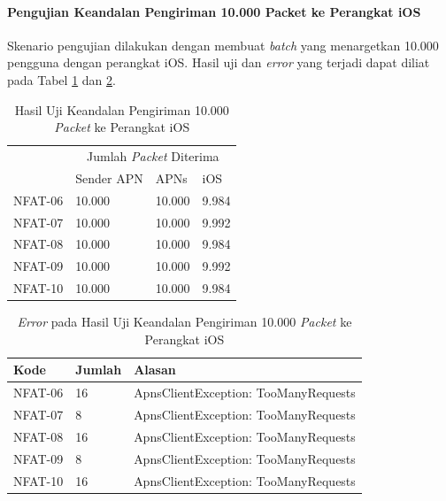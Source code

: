 \paragraph{Pengujian Keandalan Pengiriman 10.000 Packet ke Perangkat iOS}
\par Skenario pengujian dilakukan dengan membuat \textit{batch} yang menargetkan 10.000 pengguna dengan perangkat iOS. Hasil uji dan \textit{error} yang terjadi dapat diliat pada Tabel \ref{t:keandalan-ios-10k} dan \ref{t:error-keandalan-ios-10k}.
\begin{longtable}{|p{1.5cm}|p{2cm}|p{2cm}|p{2cm}|}
	\caption{Hasil Uji Keandalan Pengiriman 10.000 \textit{Packet} ke Perangkat iOS} \label{t:keandalan-ios-10k} \\ \hline
	\rowcolor{lightgray} & \multicolumn{3}{c|}{Jumlah \textit{Packet} Diterima} \\ \hhline{~|*3{-}|}
	\rowcolor{lightgray} \multirow{-2}{*}{Kode} & Sender APN & APNs & iOS \\ \hline
	NFAT-06 & 10.000 & 10.000 & 9.984 \\ \hline
	NFAT-07 & 10.000 & 10.000 & 9.992 \\ \hline
	NFAT-08 & 10.000 & 10.000 & 9.984 \\ \hline
	NFAT-09 & 10.000 & 10.000 & 9.992 \\ \hline
	NFAT-10 & 10.000 & 10.000 & 9.984 \\ \hline
\end{longtable}
\begin{longtable}{|p{1.5cm}|p{1.5cm}|p{4cm}|}
	\caption{\textit{Error} pada Hasil Uji Keandalan Pengiriman 10.000 \textit{Packet} ke Perangkat iOS} \label{t:error-keandalan-ios-10k} \\ \hline
	\rowcolor{lightgray} Kode & Jumlah & Alasan \\ \hline
	NFAT-06 & 16 & ApnsClientException: TooManyRequests \\ \hline
	NFAT-07 & 8 & ApnsClientException: TooManyRequests \\ \hline
	NFAT-08 & 16 & ApnsClientException: TooManyRequests \\ \hline
	NFAT-09 & 8 & ApnsClientException: TooManyRequests \\ \hline
	NFAT-10 & 16 & ApnsClientException: TooManyRequests \\ \hline
\end{longtable}

